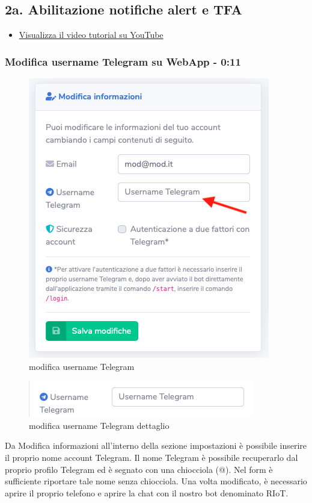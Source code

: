 \newpage \subsection{2a. Abilitazione notifiche alert e TFA}

	\begin{itemize}
		\item \href{https://www.youtube.com/watch?v=PjySMOLCtMA&list=PLPKYjnuIh1FA3b3jn_bwY_ztYzaFn2mIT&index=5}{Visualizza il video tutorial su YouTube} 
	\end{itemize}

	\subsubsection{Modifica username Telegram su WebApp - 0:11}

		\begin{figure}[H]
		\centering
		\includegraphics[scale=0.600]{res/images/membro/modUsername1.png}
		\caption{modifica username Telegram}
	\end{figure}
	\begin{figure}[H]
		\centering
		\includegraphics[scale=0.600]{res/images/membro/modUsTelegram.png}
		\caption{modifica username Telegram dettaglio}
	\end{figure}
	Da Modifica informazioni all'interno della sezione impostazioni è possibile inserire il proprio nome account Telegram. Il nome Telegram è possibile recuperarlo dal proprio profilo Telegram ed è segnato con una chiocciola (@). Nel form è sufficiente riportare tale nome senza chiocciola.
	Una volta modificato, è necessario aprire il proprio telefono e aprire la chat con il nostro bot denominato RIoT.

